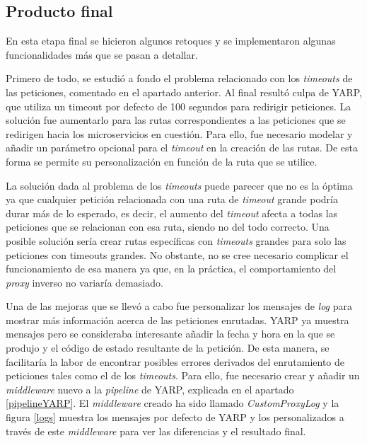 \documentclass[11pt,spanish,listoffigures]{tfgetsinf}
\begin{document}

		\subsection{Producto final}

En esta etapa final se hicieron algunos retoques y se implementaron algunas funcionalidades más que se pasan a detallar.

Primero de todo, se estudió a fondo el problema relacionado con los \emph{timeouts} de las peticiones, comentado en el apartado anterior. Al final resultó culpa de YARP, que utiliza un timeout por defecto de 100 segundos para redirigir peticiones. La solución fue aumentarlo para las rutas correspondientes a las peticiones que se redirigen hacia los microservicios en cuestión. Para ello, fue necesario modelar y añadir un parámetro opcional para el \emph{timeout} en la creación de las rutas. De esta forma se permite su personalización en función de la ruta que se utilice.

La solución dada al problema de los \emph{timeouts} puede parecer que no es la óptima ya que cualquier petición relacionada con una ruta de \emph{timeout} grande podría durar más de lo esperado, es decir, el aumento del \emph{timeout} afecta a todas las peticiones que se relacionan con esa ruta, siendo no del todo correcto. Una posible solución sería crear rutas específicas con \emph{timeouts} grandes para solo las peticiones con timeouts grandes. No obstante, no se cree necesario complicar el funcionamiento de esa manera ya que, en la práctica, el comportamiento del \emph{proxy} inverso no variaría demasiado.

Una de las mejoras que se llevó a cabo fue personalizar los mensajes de \emph{log} para mostrar más información acerca de las peticiones enrutadas. YARP ya muestra mensajes pero se consideraba interesante añadir la fecha y hora en la que se produjo y el código de estado resultante de la petición. De esta manera, se facilitaría la labor de encontrar posibles errores derivados del enrutamiento de peticiones tales como el de los \emph{timeouts}. Para ello, fue necesario crear y añadir un \emph{middleware} nuevo a la \emph{pipeline} de YARP, explicada en el apartado \ref{pipelineYARP}. El \emph{middleware} creado ha sido llamado \emph{CustomProxyLog} y la figura \ref{logs} muestra los mensajes por defecto de YARP y los personalizados a través de este \emph{middleware} para ver las diferencias y el resultado final.
\end{document}
